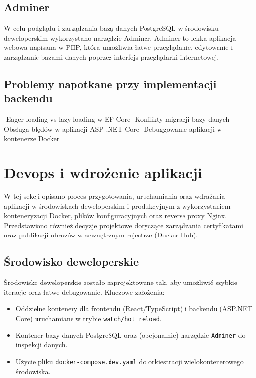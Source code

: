 \subsection{Adminer}

W celu podglądu i zarządzania bazą danych PostgreSQL w środowisku deweloperskim wykorzystano narzędzie Adminer. Adminer to lekka aplikacja webowa napisana w PHP, która umożliwia łatwe przeglądanie, edytowanie i zarządzanie bazami danych poprzez interfejs przeglądarki internetowej.


\subsection{Problemy napotkane przy implementacji backendu}
    -Eager loading vs lazy loading w EF Core
    -Konflikty migracji bazy danych
    -Obsługa błędów w aplikacji ASP .NET Core
    -Debuggowanie aplikacji w kontenerze Docker



\section{Devops i wdrożenie aplikacji}

W tej sekcji opisano proces przygotowania, uruchamiania oraz wdrażania aplikacji w środowiskach deweloperskim i produkcyjnym z wykorzystaniem konteneryzacji Docker, plików konfiguracyjnych oraz reverse proxy Nginx. Przedstawiono również decyzje projektowe dotyczące zarządzania certyfikatami oraz publikacji obrazów w zewnętrznym rejestrze (Docker Hub).

\subsection{Środowisko deweloperskie}

Środowisko deweloperskie zostało zaprojektowane tak, aby umożliwić szybkie iteracje oraz łatwe debugowanie. Kluczowe założenia:
\begin{itemize}
    \item Oddzielne kontenery dla frontendu (React/TypeScript) i backendu (ASP.NET Core) uruchamiane w trybie \texttt{watch/hot reload}.
    \item Kontener bazy danych PostgreSQL oraz (opcjonalnie) narzędzie \texttt{Adminer} do inspekcji danych.
    \item Użycie pliku \texttt{docker-compose.dev.yaml} do orkiestracji wielokontenerowego środowiska.
\end{itemize}


